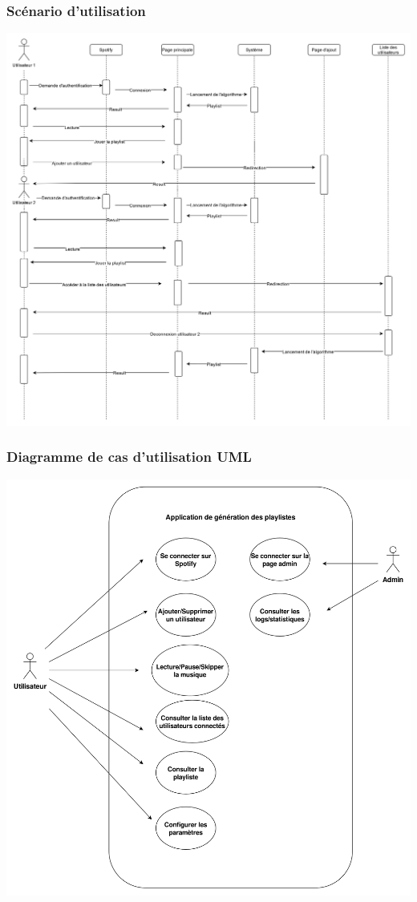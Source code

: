 \documentclass[12pt, openany]{report}
\begin{document}
 \subsubsection{Scénario d'utilisation}
 
  \includegraphics[scale=0.15]{images/scenar_user.png}
  
  \subsubsection{Diagramme de cas d'utilisation UML}
  
  \includegraphics[scale=0.17]{images/cas_dutilisation.png}
  
\end{document}
